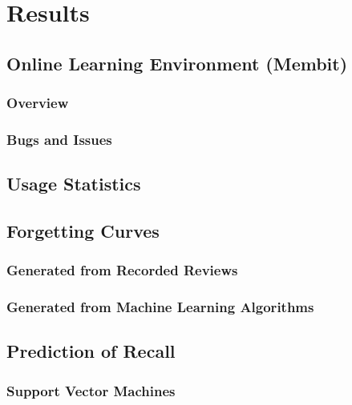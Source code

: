 \section{Results}

\subsection{Online Learning Environment (Membit)}
\subsubsection{Overview}
\subsubsection{Bugs and Issues}

\subsection{Usage Statistics}

\subsection{Forgetting Curves}
\subsubsection*{Generated from Recorded Reviews}
\subsubsection*{Generated from Machine Learning Algorithms}

\subsection{Prediction of Recall}
\subsubsection*{Support Vector Machines}
